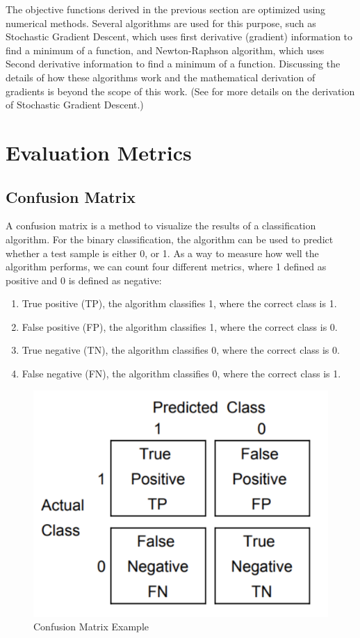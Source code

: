 The objective functions derived in the previous section are optimized using numerical methods. Several algorithms are used for this purpose, such as Stochastic Gradient Descent, which uses first derivative (gradient) information to find a minimum of a function, and Newton-Raphson algorithm, which uses Second derivative information to find a minimum of a function. Discussing the details of how these algorithms work and the mathematical derivation of gradients is beyond the scope of this work. (See \citep{jurafsky2014speech} for more details on the derivation of Stochastic Gradient Descent.) 

\section{Evaluation Metrics}
\subsection{Confusion Matrix}

A confusion matrix is a method to visualize the results of a classification algorithm. For the binary classification, the algorithm can be used to predict whether a test sample is either 0, or 1. As a way to measure how well the algorithm performs, we can count four different metrics, where 1 defined as positive and 0 is defined as negative:

\begin{enumerate}

\item True positive (TP), the algorithm classifies 1, where the correct class is 1.
\item False positive (FP), the algorithm classifies 1, where the correct class is 0.
\item True negative (TN), the algorithm classifies 0, where the correct class is 0.
\item False negative (FN), the algorithm classifies 0, where the correct class is 1.

\end{enumerate}

\begin{figure}[hbtp]
\caption{Confusion Matrix Example}
\includegraphics[scale=.5]{../Figures/Confuse_Mat_Example.png}\centering
\end{figure}


